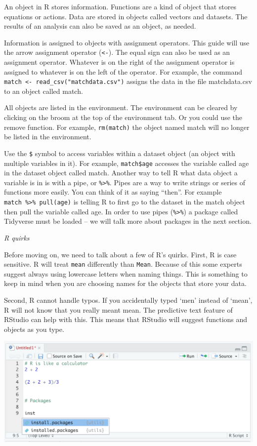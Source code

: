 \documentclass[
]{book}
\begin{document}
An object in R stores information. Functions are a kind of object that stores equations or actions. Data are stored in objects called vectors and datasets. The results of an analysis can also be saved as an object, as needed.

Information is assigned to objects with assignment operators. This guide will use the arrow assignment operator (\texttt{\textless{}-}). The equal sign can also be used as an assignment operator. Whatever is on the right of the assignment operator is assigned to whatever is on the left of the operator. For example, the command \texttt{match\ \textless{}-\ read\_csv("matchdata.csv")} assigns the data in the file matchdata.csv to an object called match.

All objects are listed in the environment. The environment can be cleared by clicking on the broom at the top of the environment tab. Or you could use the remove function. For example, \texttt{rm(match)} the object named match will no longer be listed in the environment.

Use the \texttt{\$} symbol to access variables within a dataset object (an object with multiple variables in it). For example, \texttt{match\$age} accesses the variable called age in the dataset object called match. Another way to tell R what data object a variable is in is with a pipe, or \texttt{\%\textgreater{}\%}. Pipes are a way to write strings or series of functions more easily. You can think of it as saying ``then''. For example \texttt{match\ \%\textgreater{}\%\ pull(age)} is telling R to first go to the dataset in the match object then pull the variable called age. In order to use pipes (\texttt{\%\textgreater{}\%}) a package called Tidyverse must be loaded -- we will talk more about packages in the next section.

\emph{R quirks}

Before moving on, we need to talk about a few of R's quirks. First, R is case sensitive. R will treat \texttt{mean} differently than \texttt{Mean}. Because of this some experts suggest always using lowercase letters when naming things. This is something to keep in mind when you are choosing names for the objects that store your data.

Second, R cannot handle typos. If you accidentally typed `men' instead of `mean', R will not know that you really meant mean. The predictive text feature of RStudio can help with this. This means that RStudio will suggest functions and objects as you type.

\includegraphics{img/NAVIGATING AND COMMANDS R110.png}
\end{document}
